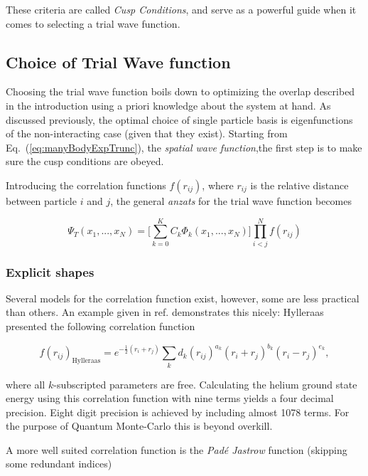 These criteria are called \textit{Cusp Conditions}, and serve as a powerful guide when it comes to selecting a trial wave function. 

\subsection{Choice of Trial Wave function}
\label{sec:ChoiceTrialWF}

Choosing the trial wave function boils down to optimizing the overlap described in the introduction using a priori knowledge about the system at hand. As discussed previously, the optimal choice of single particle basis is eigenfunctions of the non-interacting case (given that they exist). Starting from Eq.~(\ref{eq:manyBodyExpTrunc}), the \textit{spatial wave function},the first step is to make sure the cusp conditions are obeyed.

Introducing the correlation functions $f(r_{ij})$, where $r_{ij}$ is the relative distance between particle $i$ and $j$, the general \textit{anzats} for the trial wave function becomes

\begin{equation}
\label{eq:firstAnzatsTWF}
 \Psi_T(x_1, ..., x_N) = \Big[\sum_{k=0}^K C_k\Phi_k(x_1, ..., x_N)\Big]\prod_{i<j}^Nf(r_{ij})
\end{equation}

\subsubsection{Explicit shapes}

Several models for the correlation function exist, however, some are less practical than others. An example given in ref. \cite{abInitioMC} demonstrates this nicely: Hylleraas presented the following correlation function 

\begin{equation}
 f(r_{ij})_\mathrm{Hylleraas} = e^{-\frac{1}{2} (r_i + r_j)}\sum_k d_k(r_{ij})^{a_k} (r_i + r_j)^{b_k}(r_i - r_j)^{e_k},
\end{equation}

where all $k$-subscripted parameters are free. Calculating the helium ground state energy using this correlation function with nine terms yields a four decimal precision. Eight digit precision is achieved by including almost 1078 terms. For the purpose of Quantum Monte-Carlo this is beyond overkill. 

A more well suited correlation function is the \textit{Padé Jastrow} function (skipping some redundant indices) 

